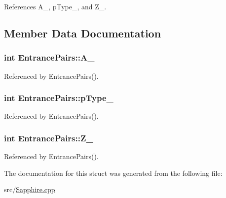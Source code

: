 References A\-\_\-, p\-Type\-\_\-, and Z\-\_\-.



\subsection{Member Data Documentation}
\hypertarget{structEntrancePairs_a6bd8b17d8247c69caf069136a78410e5}{
\subsubsection[{A\-\_\-}]{\setlength{\rightskip}{0pt plus 5cm}int Entrance\-Pairs\-::\-A\-\_\-}}\label{structEntrancePairs_a6bd8b17d8247c69caf069136a78410e5}


Referenced by Entrance\-Pairs().

\hypertarget{structEntrancePairs_adeb1d5712ece6d721bdda9eea372ea27}{
\subsubsection[{p\-Type\-\_\-}]{\setlength{\rightskip}{0pt plus 5cm}int Entrance\-Pairs\-::p\-Type\-\_\-}}\label{structEntrancePairs_adeb1d5712ece6d721bdda9eea372ea27}


Referenced by Entrance\-Pairs().

\hypertarget{structEntrancePairs_a1381c1f783a84f47b20d8ba994bd6c3c}{
\subsubsection[{Z\-\_\-}]{\setlength{\rightskip}{0pt plus 5cm}int Entrance\-Pairs\-::\-Z\-\_\-}}\label{structEntrancePairs_a1381c1f783a84f47b20d8ba994bd6c3c}


Referenced by Entrance\-Pairs().



The documentation for this struct was generated from the following file\-:\begin{DoxyCompactItemize}
\item 
src/\hyperlink{Sapphire_8cpp}{Sapphire.\-cpp}\end{DoxyCompactItemize}
